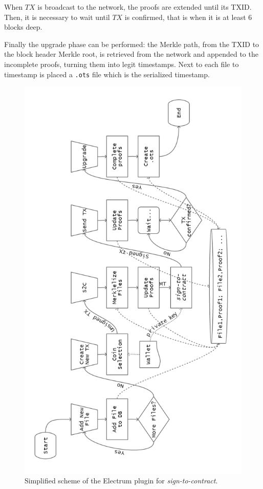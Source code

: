 When $TX$ is broadcast to the network, the proofs are extended until its TXID.
Then, it is necessary to wait until $TX$ is confirmed, that is when it is at least 6 blocks deep. 

Finally the upgrade phase can be performed: the Merkle path, from the TXID to the block header Merkle root, is retrieved from the network and appended to the incomplete proofs, turning them into legit timestamps.
Next to each file to timestamp is placed a \verb|.ots| file which is the serialized timestamp.

\begin{figure}
	\begin{center}
		\includegraphics[width=0.75\linewidth]{Images/plugin-working.png}
		\caption[Simplified scheme of the Electrum plugin.]{Simplified scheme of the Electrum plugin for \textit{sign-to-contract}.}
		\label{fig:plugin-scheme}
	\end{center}
\end{figure}